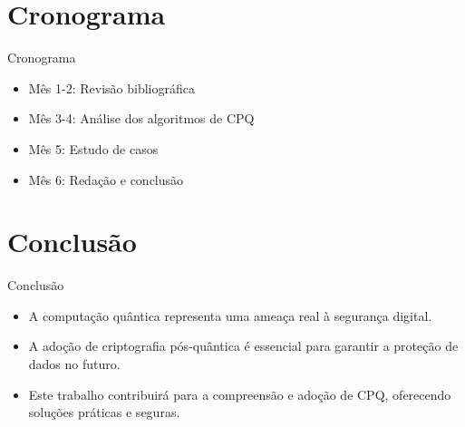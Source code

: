 \documentclass{beamer}
\begin{document}
	\section{Cronograma}
	\begin{frame}{Cronograma}
		\begin{itemize}
			\item Mês 1-2: Revisão bibliográfica
			\item Mês 3-4: Análise dos algoritmos de CPQ
			\item Mês 5: Estudo de casos
			\item Mês 6: Redação e conclusão
		\end{itemize}
	\end{frame}
	
	\section{Conclusão}
	\begin{frame}{Conclusão}
		\begin{itemize}
			\item A computação quântica representa uma ameaça real à segurança digital.
			\item A adoção de criptografia pós-quântica é essencial para garantir a proteção de dados no futuro.
			\item Este trabalho contribuirá para a compreensão e adoção de CPQ, oferecendo soluções práticas e seguras.
		\end{itemize}
	\end{frame}
	
\end{document}
